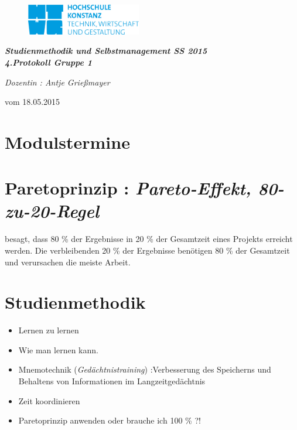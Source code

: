 \documentclass[11pt,a4paper]{article}
\begin{document}
	\begin{figure}
  	\hspace*{-15.0mm} {\includegraphics[width=50mm]{logo}}
  	\end{figure}
  
\hspace{10mm}
\begin{center}

\textit{\textbf{\Huge{ Studienmethodik und Selbstmanagement  SS 2015}}}\\
\emph{\textbf{4.Protokoll Gruppe 1} }
\begin{flushleft}
\textit{ Dozentin :  Antje Grießmayer }
\end{flushleft}

\end{center}
\begin{flushright}
vom 18.05.2015
\end{flushright}
\section*{Modulstermine}
\section*{Paretoprinzip :  \textit{Pareto-Effekt, 80-zu-20-Regel}}
besagt, dass 80 \% der Ergebnisse in 20 \% der Gesamtzeit eines Projekts erreicht werden. Die verbleibenden 20 \% der Ergebnisse benötigen 80 \% der Gesamtzeit und verursachen die meiste Arbeit.

\section*{Studienmethodik}
\begin{itemize}
\item Lernen zu lernen
\item Wie man lernen kann.
\item Mnemotechnik (\emph{Gedächtnistraining}) :Verbesserung des Speicherns und Behaltens von Informationen im Langzeitgedächtnis
\item Zeit koordinieren 
\item Paretoprinzip anwenden oder brauche ich 100 \% ?!
\end{itemize}
\end{document}

